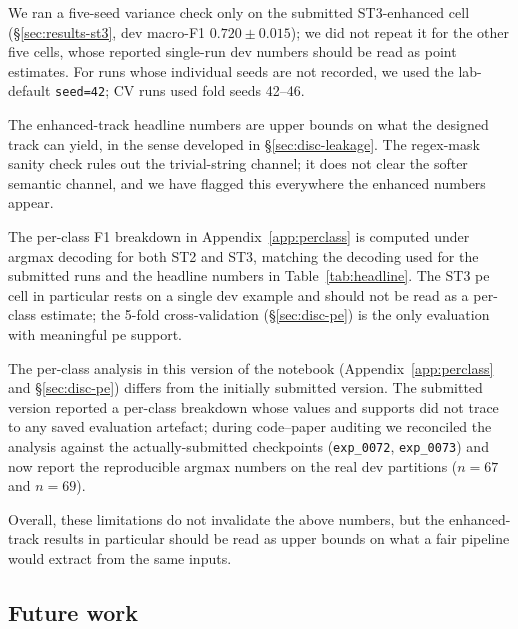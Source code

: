 We ran a five-seed variance check only on the submitted ST3-enhanced cell (\S\ref{sec:results-st3}, dev macro-F1 $0.720 \pm 0.015$); we did not repeat it for the other five cells, whose reported single-run dev numbers should be read as point estimates. %
For runs whose individual seeds are not recorded, we used the lab-default \texttt{seed=42}; CV runs used fold seeds 42--46.

The enhanced-track headline numbers are upper bounds on what the designed track can yield, in the sense developed in \S\ref{sec:disc-leakage}. The regex-mask sanity check rules out the trivial-string channel; it does not clear the softer semantic channel, and we have flagged this everywhere the enhanced numbers appear. %

The per-class F1 breakdown in Appendix~\ref{app:perclass} is computed under argmax decoding for both ST2 and ST3, matching the decoding used for the submitted runs and the headline numbers in Table~\ref{tab:headline}. The ST3 \textsf{pe} cell in particular rests on a single dev example and should not be read as a per-class estimate; the 5-fold cross-validation (\S\ref{sec:disc-pe}) is the only evaluation with meaningful \textsf{pe} support. %

The per-class analysis in this version of the notebook (Appendix~\ref{app:perclass} and \S\ref{sec:disc-pe}) differs from the initially submitted version. The submitted version reported a per-class breakdown whose values and supports did not trace to any saved evaluation artefact; during code--paper auditing we reconciled the analysis against the actually-submitted checkpoints (\texttt{exp\_0072}, \texttt{exp\_0073}) and now report the reproducible argmax numbers on the real dev partitions ($n=67$ and $n=69$).

Overall, these limitations do not invalidate the above numbers, but the enhanced-track results in particular should be read as upper bounds on what a fair pipeline would extract from the same inputs.

\subsection{Future work}
\label{sec:future}

